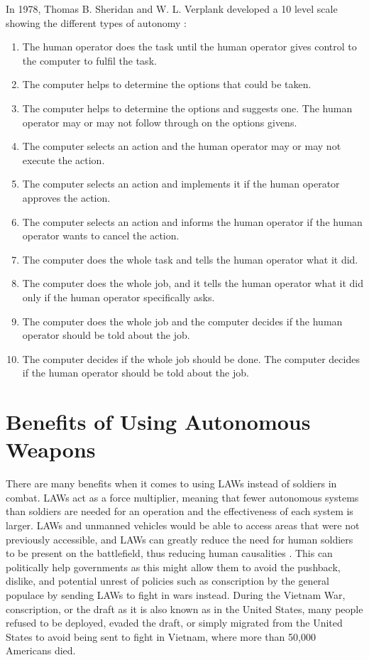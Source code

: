 \documentclass[journal]{IEEEtran}
\begin{document}
In 1978, Thomas B. Sheridan and W. L. Verplank developed a 10 level scale showing the different types of autonomy \cite{sheridan1978human}: 
\begin{enumerate} 
	\item The human operator does the task until the human operator gives control to the computer to fulfil the task.
	\item The computer helps to determine the options that could be taken.
	\item The computer helps to determine the options and suggests one. The human operator may or may not follow through on the options givens.
	\item The computer selects an action and the human operator may or may not execute the action.
	\item The computer selects an action and implements it if the human operator approves the action.
	\item The computer selects an action and informs the human operator if the human operator wants to cancel the action.
	\item The computer does the whole task and tells the human operator what it did.
	\item The computer does the whole job, and it tells the human operator what it did only if the human operator specifically asks.
	\item The computer does the whole job and the computer decides if the human operator should be told about the job.
	\item The computer decides if the whole job should be done. The computer decides if the human operator should be told about the job.
\end{enumerate}

\section{Benefits of Using Autonomous Weapons}
There are many benefits when it comes to using LAWs instead of soldiers in combat. LAWs act as a force multiplier, meaning that fewer autonomous systems than soldiers are needed for an operation and the effectiveness of each system is larger. LAWs and unmanned vehicles would be able to access areas that were not previously accessible, and LAWs can greatly reduce the need for human soldiers to be present on the battlefield, thus reducing human causalities \cite{etzioni2017pros}. This can politically help governments as this might allow them to avoid the pushback, dislike, and potential unrest of policies such as conscription by the general populace by sending LAWs to fight in wars instead. During the Vietnam War, conscription, or the draft as it is also known as in the United States, many people refused to be deployed, evaded the draft, or simply migrated from the United States to avoid being sent to fight in Vietnam, where more than 50,000 Americans died.
\end{document}
